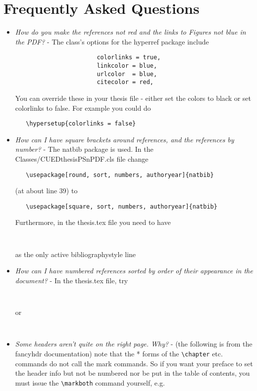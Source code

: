 \documentclass{article}
\begin{document}
\section{Frequently Asked Questions}
\begin{itemize}
\item \textit{How do you make the references not red and the links to Figures not blue in the PDF?} - The class's options for the hyperref package include  
\begin{verbatim}
                       colorlinks = true,
                       linkcolor = blue,
                       urlcolor  = blue,
                       citecolor = red,
\end{verbatim}
You can override these in your thesis file - either set the colors to black or set colorlinks to false. For example you could do
\begin{verbatim}
   \hypersetup{colorlinks = false}
\end{verbatim}

\item \textit{How can I have square brackets around references, and the references by number?} - The natbib package is used. In the Classes/CUEDthesisPSnPDF.cls file change
\begin{verbatim}
   \usepackage[round, sort, numbers, authoryear]{natbib}
\end{verbatim}
      (at about line 39) to
\begin{verbatim}
   \usepackage[square, sort, numbers, authoryear]{natbib}
\end{verbatim}
      Furthermore, in the thesis.tex file you need to have
\begin{verbatim}
   
\end{verbatim}
as the only active bibliographystyle line
\item \textit{How can I have numbered references sorted by order of their appearance in the document?} - In the thesis.tex file, try
\begin{verbatim}
       
\end{verbatim}
      or
\begin{verbatim}
       
\end{verbatim}
\item \textit{Some headers aren't quite on the right page. Why?} - (the following is from the fancyhdr documentation) note that the * forms of the  \verb|\chapter| etc. commands do not call the mark commands. So if you want your preface to set the header info but not be numbered nor be put in the table of contents, you must issue the  \verb|\markboth| command yourself, e.g.
\begin{verbatim}

\end{verbatim}
\end{itemize}
\end{document}
